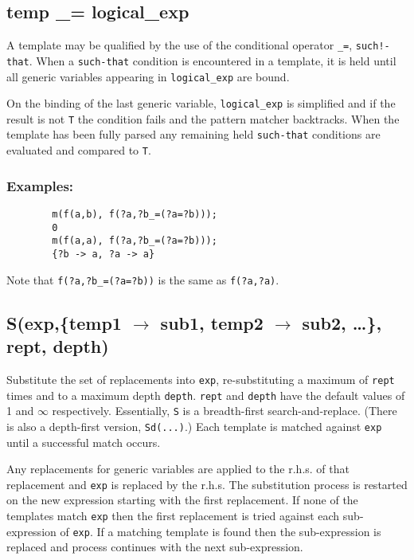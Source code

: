 \subsection{temp \_= logical\_exp}

A template may be qualified by the use of the conditional operator \texttt{\_=},
\texttt{such!-that}.  When a \texttt{such-that} condition is encountered in a template, it
is held until all generic variables appearing in \texttt{logical\_exp} are bound.

On the binding of the last generic variable, \texttt{logical\_exp} is simplified
and if the result is not \texttt{T} the condition fails and the pattern matcher
backtracks.  When the template has been fully parsed any remaining
held \texttt{such-that} conditions are evaluated and compared to \texttt{T}.

\subsubsection*{Examples:}

\begin{verbatim}
        m(f(a,b), f(?a,?b_=(?a=?b)));
        0
        m(f(a,a), f(?a,?b_=(?a=?b)));
        {?b -> a, ?a -> a}
\end{verbatim}
Note that \texttt{f(?a,?b\_=(?a=?b))} is the same as \texttt{f(?a,?a)}.


\subsection[S(exp,\{temp1 -> sub1, temp2 -> sub2, \ldots\}, rept, depth)]{S(exp,\{temp1 $\to$ sub1, temp2 $\to$ sub2, \ldots\}, rept, depth)}

Substitute the set of replacements into \texttt{exp}, re-substituting a maximum
of \texttt{rept} times and to a maximum depth \texttt{depth}. \texttt{rept} and
\texttt{depth} have the default values of 1 and $\infty$ respectively.
Essentially, \texttt{S} is a breadth-first search-and-replace.  (There is also a
depth-first version, \texttt{Sd(...)}.)  Each template is matched against
\texttt{exp} until a successful match occurs.

Any replacements for generic variables are applied to the r.h.s. of that
replacement and \texttt{exp} is replaced by the r.h.s.  The substitution process
is restarted on the new expression starting with the first replacement.  If none
of the templates match \texttt{exp} then the first replacement is tried against
each sub-expression of \texttt{exp}. If a matching template is found then the
sub-expression is replaced and process continues with the next sub-expression.

